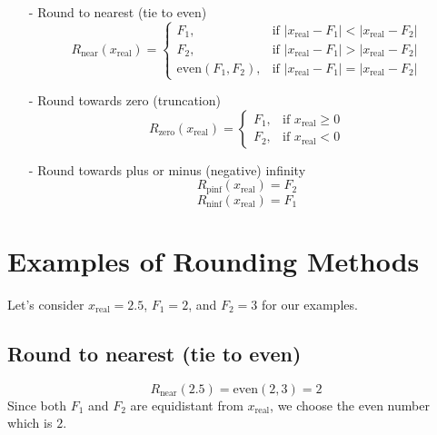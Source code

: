 \documentclass[12pt,openany, tikz,border=10pt]{book}
\begin{document}
			      	\begin{itemize}
			      		\item[-] Round to nearest (tie to even)
			      		      \[ R_{\text{near}}(x_{\text{real}}) = 
			      		      	\begin{cases} 
			      		      		F_1,                   & \text{if } |x_{\text{real}} - F_1| < |x_{\text{real}} - F_2| \\
			      		      		F_2,                   & \text{if } |x_{\text{real}} - F_1| > |x_{\text{real}} - F_2| \\
			      		      		\text{even}(F_1, F_2), & \text{if } |x_{\text{real}} - F_1| = |x_{\text{real}} - F_2| 
			      		      	\end{cases}
			      		      \]
			      		          
			      		\item[-] Round towards zero (truncation)
			      		      \[ R_{\text{zero}}(x_{\text{real}}) = 
			      		      	\begin{cases} 
			      		      		F_1, & \text{if } x_{\text{real}} \geq 0 \\
			      		      		F_2, & \text{if } x_{\text{real}} < 0    
			      		      	\end{cases}
			      		      \]
			      		          
			      		\item[-] Round towards plus or minus (negative) infinity
			      		      \[ R_{\text{pinf}}(x_{\text{real}}) = F_2 \]
			      		      \[ R_{\text{ninf}}(x_{\text{real}}) = F_1 \]
			      	\end{itemize}
			      	
			      	\section*{Examples of Rounding Methods}
			      	
			      	Let's consider \( x_{\text{real}} = 2.5 \), \( F_1 = 2 \), and \( F_2 = 3 \) for our examples.
			      	
			      	\subsection*{Round to nearest (tie to even)}
			      	\[ R_{\text{near}}(2.5) = \text{even}(2, 3) = 2 \]
			      	Since both \( F_1 \) and \( F_2 \) are equidistant from \( x_{\text{real}} \), we choose the even number which is \( 2 \).
			      	
\end{document}
